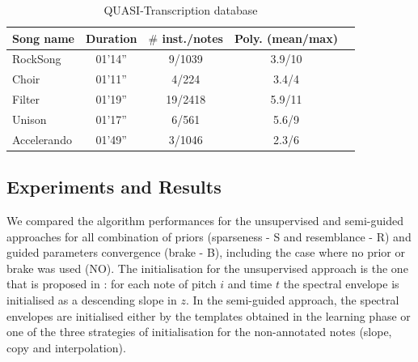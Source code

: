 \documentclass{article}
\begin{document}
\begin{table}[htb]
\centering
\begin{tabular}{lcccc}
\\
\hline
Song name & Duration & $\#$ inst./notes & Poly. (mean/max) \\\hline
RockSong & 01'14'' & 9/1039 & 3.9/10 \\
Choir & 01'11'' & 4/224 & 3.4/4 \\
Filter & 01'19'' & 19/2418 & 5.9/11 \\
Unison & 01'17'' & 6/561 & 5.6/9 \\
Accelerando & 01'49'' & 3/1046 & 2.3/6 \\
\end{tabular}
\caption{QUASI-Transcription database}
\label{tab:quaero}
\end{table}


\subsection{Experiments and Results}


We compared the algorithm performances for the unsupervised and semi-guided approaches for all combination of priors (sparseness - S and resemblance - R) and guided parameters convergence (brake - B), including the case where no prior or brake was used (NO). The initialisation for the unsupervised approach is the one that is proposed in \cite{Fuentes2013_PhD}: for each note of pitch $i$ and time $t$ the spectral envelope is initialised as a descending slope in $z$. In the semi-guided approach, the spectral envelopes are initialised either by the templates obtained in the learning phase or one of the three strategies of initialisation for the non-annotated notes (slope, copy and interpolation).
\end{document}
